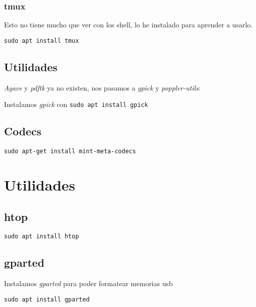 \documentclass[
  12pt,
  spanish,
]{article}
\begin{document}
\hypertarget{tmux}{%
\subsubsection{tmux}\label{tmux}}

Esto no tiene mucho que ver con los shell, lo he instalado para aprender
a usarlo.

\begin{verbatim}
sudo apt install tmux
\end{verbatim}

\hypertarget{utilidades}{%
\subsection{Utilidades}\label{utilidades}}

\emph{Agave} y \emph{pdftk} ya no existen, nos pasamos a \emph{gpick} y
\emph{poppler-utils}:

Instalamos \emph{gpick} con \texttt{sudo\ apt\ install\ gpick}

\hypertarget{codecs}{%
\subsection{Codecs}\label{codecs}}

\begin{verbatim}
sudo apt-get install mint-meta-codecs
\end{verbatim}

\hypertarget{utilidades-1}{%
\section{Utilidades}\label{utilidades-1}}

\hypertarget{htop}{%
\subsection{htop}\label{htop}}

\begin{verbatim}
sudo apt install htop
\end{verbatim}

\hypertarget{gparted}{%
\subsection{gparted}\label{gparted}}

Instalamos \emph{gparted} para poder formatear memorias usb

\texttt{sudo\ apt\ install\ gparted}
\end{document}
